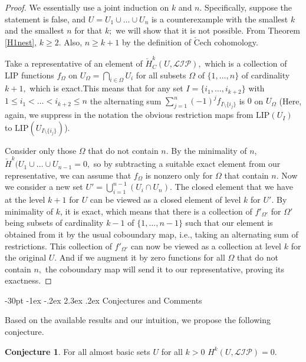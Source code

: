 \documentclass[10pt]{article}
\makeatletter
\renewcommand\section{\@startsection {section}{1}{\z@}
{-30pt \@plus -1ex \@minus -.2ex}
{2.3ex \@plus.2ex}
{\normalfont\normalsize\bfseries\boldmath}}
\theoremstyle{definition}
\newtheorem{conjecture}{Conjecture}
\makeatother
\begin{document}
\begin{proof} We essentially use a joint induction on $k$ and $n$. Specifically, suppose the statement is false, and $U=U_1\cup \ldots \cup U_n$ is a counterexample with the smallest $k$ and the smallest $n$ for that $k;$ we will show that it is not possible. From Theorem \ref{H1nest}, $k\geq 2.$ Also, $n\geq k+1$ by the definition of $\check{\textrm{C}}$ech cohomology.

Take a representative of an element of  $\check{H}^k_C(U,\mathcal{LIP}),$  which is a collection of LIP functions $f_{\Omega}$ on $U_{\Omega}=\bigcap \limits_{i\in \Omega} U_i$ for all subsets $\Omega$ of $\{1,\ldots, n\}$ of cardinality $k+1,$ which is exact.This means that for any set $I=\{i_1,\ldots,i_{k+2}\}$ with $1\leq i_1<\ldots <i_{k+2}\leq n$ the alternating sum $\sum \limits_{j=1}^n  (-1)^j  f_{I\setminus \{i_j\}}$ is $0$ on $U_{\Omega}$ (Here, again, we suppress in the notation the obvious restriction maps from $\textrm{LIP}(U_I)$ to $\textrm{LIP}(U_{I\setminus \{i_j\}}) $).

Consider only those $\Omega$ that do not contain $n.$ By the minimality of $n$, $\check{H}^k(U_1\cup \ldots \cup U_{n-1}=0,$ so by subtracting a suitable exact element from our representative, we can assume that $f_{\Omega}$ is nonzero only for $\Omega$ that contain $n.$ Now we consider a new set $U'=\bigcup \limits_{i=1}^{n-1} (U_i\cap U_n).$ The closed element that we have at the level $k+1$ for $U$ can be viewed as a closed element of level $k$ for $U'.$ By minimality of $k$, it is exact, which means that there is a collection of $f'_{\Omega '}$ for $\Omega '$ being subsets of cardinality $k-1$ of $\{1,\ldots,n-1\}$ such that our element is obtained from it by the usual coboundary map, i.e., taking an alternating sum of restrictions. This  collection of $f'_{\Omega '}$ can now be viewed as a collection at level $k$ for the original $U$. And if we augment it by zero functions for all $\Omega$ that do not contain $n,$ the coboundary map will send it to our representative, proving its exactness.
\end{proof}

\section{Conjectures and Comments}

Based on the available results and our intuition, we propose the following conjecture.

\begin{conjecture}
For all almost basic sets $U$ for all $k>0$ $H^k(U, \mathcal{LIP})=0.$  
\end{conjecture}
\end{document}

